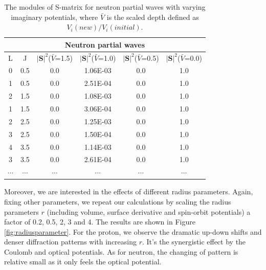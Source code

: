 \documentclass[12pt]{article}
\begin{document}
\begin{table}[]
\centering
\begin{tabular}{cccccc}
\toprule
\toprule
\multicolumn{6}{c}{Neutron partial waves}                                                                         \\
 \midrule
L                     & J                     & $|\mathbf{S}|^2$($\bar{V}$=1.5) & $|\mathbf{S}|^2$($\bar{V}$=1.0) & $|\mathbf{S}|^2$($\bar{V}$=0.5) & $|\mathbf{S}|^2$($\bar{V}$=0.0) \\
0 & 0.5 & 0.0                          & 1.06E-03                     & 0.0                          & 1.0                          \\
1 & 0.5 & 0.0                          & 2.51E-04                     & 0.0                          & 1.0                          \\
2 & 1.5 & 0.0                          & 1.08E-03                     & 0.0                          & 1.0                          \\
1 & 1.5 & 0.0                          & 3.06E-04                     & 0.0                          & 1.0                          \\
2 & 2.5 & 0.0                          & 1.25E-03                     & 0.0                          & 1.0                          \\
3 & 2.5 & 0.0                          & 1.50E-04                     & 0.0                          & 1.0                          \\
4 & 3.5 & 0.0                          & 1.14E-03                     & 0.0                          & 1.0                          \\
3 & 3.5 & 0.0                          & 2.61E-04                     & 0.0                          & 1.0                          \\   
$\cdots$           &$\cdots$                    & $\cdots$                            & $\cdots$                           & $\cdots$                           & $\cdots$                                                                \\
\bottomrule
\bottomrule
\end{tabular}
\caption{The modules of S-matrix for neutron partial waves with varying imaginary potentials, where $\bar{V}$ is the scaled depth defined as $V_i(new)/V_i(initial)$.}
\label{nSmatrix}
\end{table}
	
	Moreover, we are interested in the effects of different radius parameters. Again, fixing other parameters, we repeat our calculations by scaling the radius parameters $r$ (including volume, surface derivative and spin-orbit potentials) a factor of 0.2, 0.5, 2, 3 and 4. The results are shown in Figure \ref{fig:radiusparameter}. For the proton, we observe the dramatic up-down shifts and denser diffraction patterns with increasing $r$. It's the synergistic effect by the Coulomb and optical potentials. As for neutron, the changing of pattern is relative small as it only feels the optical potential. 
	
\end{document}
